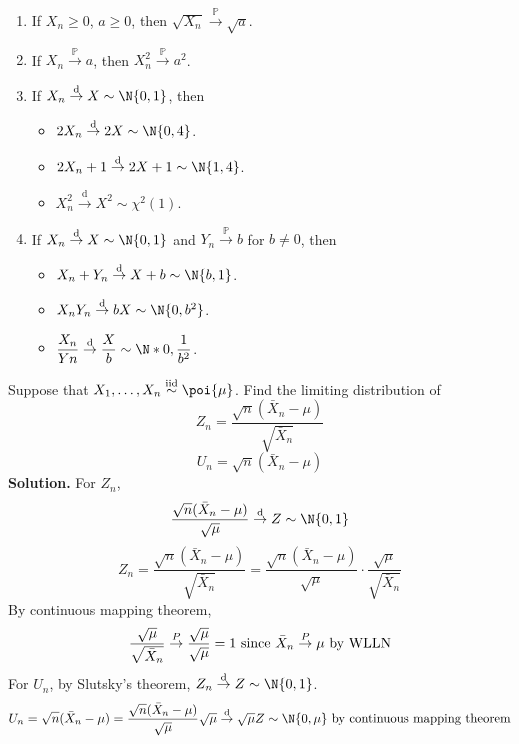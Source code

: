 \begin{Example}{}{}
    \begin{enumerate}[label=(\roman*)]
        \item If $ X_n\ge 0 $, $ a\ge 0 $, then $ \sqrt{X_n}\stackrel{\mathbb{P}}{\to}\sqrt{a} $.
        \item If $ X_n \stackrel{\mathbb{P}}{\to} a $, then
              $ X_n^2\stackrel{\mathbb{P}}{\to}a^2 $.
        \item If $ X_n\stackrel{\text{d}}{\to}X \sim \N{0,1} $, then
              \begin{itemize}
                  \item $ 2X_n\stackrel{\text{d}}{\to}2X\sim\N{0,4} $.
                  \item $ 2X_n+1\stackrel{\text{d}}{\to}2X+1\sim\N{1,4} $.
                  \item $ X_n^2\stackrel{\text{d}}{\to} X^2 \sim \chi^2(1) $.
              \end{itemize}
        \item If $ X_n\stackrel{\text{d}}{\to}X \sim \N{0,1} $
              and $ Y_n\stackrel{\mathbb{P}}{\to}b $ for $ b\neq 0 $, then
              \begin{itemize}
                  \item $ X_n+Y_n\stackrel{\text{d}}{\to}X+b \sim \N{b,1} $.
                  \item $ X_n Y_n \stackrel{\text{d}}{\to}bX \sim \N{0,b^2} $.
                  \item $ \displaystyle \frac{X_n}{Yn} \stackrel{\text{d}}{\to}
                            \frac{X}{b}\sim \N*{0,\frac{1}{b^2}} $.
              \end{itemize}
    \end{enumerate}
\end{Example}
\begin{Example}{}{}
    Suppose that $ X_1,\ldots,X_n\stackrel{\text{iid}}{\sim}\poi{\mu} $.
    Find the limiting distribution of
    \[ Z_n=\frac{\sqrt{n}(\bar{X}_n-\mu)}{\sqrt{\bar{X}_n}}  \]
    \[ U_n=\sqrt{n}(\bar{X}_n-\mu) \]
    \textbf{Solution.} For $ Z_n $,
    \[ \frac{\sqrt{n}(\bar{X}_n-\mu)}{\sqrt{\mu}}\stackrel{\text{d}}{\to}Z
        \sim \N{0,1}  \]
    \[ Z_n=\frac{\sqrt{n}(\bar{X}_n-\mu)}{\sqrt{\bar{X}_n}}=
        \frac{\sqrt{n}(\bar{X}_n-\mu)}{\sqrt{\mu}}\cdot\frac{\sqrt{\mu}}{\sqrt{\bar{X}_n}}    \]
    By continuous mapping theorem,
    \[ \frac{\sqrt{\mu}}{\sqrt{\bar{X}_n}}\stackrel{\mathbb{P}}{\to}\frac{\sqrt{\mu}}{\sqrt{\mu}}=1
        \text{ since $ \bar{X}_n\stackrel{\mathbb{P}}{\to}\mu $ by WLLN} \]
    For $ U_n $, by Slutsky's theorem, $ Z_n\stackrel{\text{d}}{\to}Z \sim \N{0,1} $.
    \[ U_n=\sqrt{n}(\bar{X}_n-\mu)=\frac{\sqrt{n}(\bar{X}_n-\mu)}{\sqrt{\mu}}\sqrt{\mu}
        \stackrel{\text{d}}{\to}\sqrt{\mu}Z \sim \N{0,\mu}\text{ by
            continuous mapping theorem}  \]
\end{Example}
